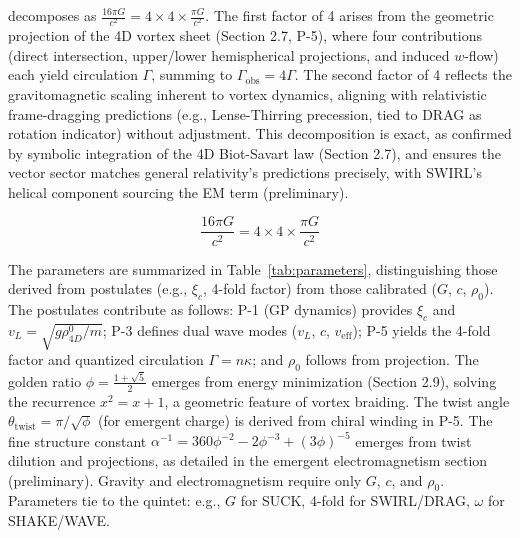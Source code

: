 decomposes as $\frac{16\pi G}{c^2} = 4 \times 4 \times \frac{\pi G}{c^2}$. The first factor of 4 arises from the geometric projection of the 4D vortex sheet (Section 2.7, P-5), where four contributions (direct intersection, upper/lower hemispherical projections, and induced $w$-flow) each yield circulation $\Gamma$, summing to $\Gamma_{\text{obs}} = 4\Gamma$. The second factor of 4 reflects the gravitomagnetic scaling inherent to vortex dynamics, aligning with relativistic frame-dragging predictions (e.g., Lense-Thirring precession, tied to DRAG as rotation indicator) without adjustment. This decomposition is exact, as confirmed by symbolic integration of the 4D Biot-Savart law (Section 2.7), and ensures the vector sector matches general relativity's predictions precisely, with SWIRL's helical component sourcing the EM term (preliminary).

\begin{equation}
\frac{16\pi G}{c^2} = 4 \times 4 \times \frac{\pi G}{c^2}
\end{equation}

The parameters are summarized in Table~\ref{tab:parameters}, distinguishing those derived from postulates (e.g., $\xi_c$, 4-fold factor) from those calibrated ($G$, $c$, $\rho_0$). The postulates contribute as follows: P-1 (GP dynamics) provides $\xi_c$ and $v_L = \sqrt{g \rho_{4D}^0 / m}$; P-3 defines dual wave modes ($v_L$, $c$, $v_{\text{eff}}$); P-5 yields the 4-fold factor and quantized circulation $\Gamma = n \kappa$; and $\rho_0$ follows from projection. The golden ratio $\phi = \frac{1 + \sqrt{5}}{2}$ emerges from energy minimization (Section 2.9), solving the recurrence $x^2 = x + 1$, a geometric feature of vortex braiding. The twist angle $\theta_{\text{twist}} = \pi / \sqrt{\phi}$ (for emergent charge) is derived from chiral winding in P-5. The fine structure constant $\alpha^{-1} = 360 \phi^{-2} - 2 \phi^{-3} + (3 \phi)^{-5}$ emerges from twist dilution and projections, as detailed in the emergent electromagnetism section (preliminary). Gravity and electromagnetism require only $G$, $c$, and $\rho_0$. Parameters tie to the quintet: e.g., $G$ for SUCK, 4-fold for SWIRL/DRAG, $\omega$ for SHAKE/WAVE.

